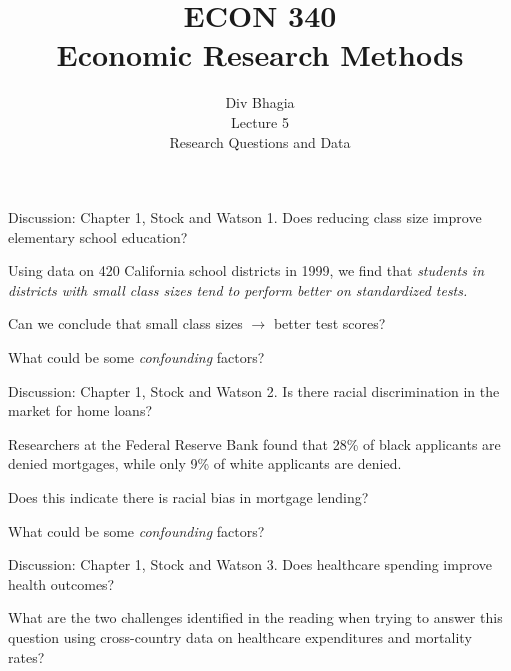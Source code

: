 \documentclass{./../div_teaching_slides}
\begin{document}
\title{ECON 340 \\ Economic Research Methods}
\author{Div Bhagia \\\vspace{1.75em}
Lecture 5 \\\vspace{0.25em} \small Research Questions and Data}
\date{}

\begin{frame}
\maketitle
\end{frame}

\begin{frame}{Discussion: Chapter 1, Stock and Watson}
1. Does reducing class size improve elementary school education? \\ \vspace{0.5em}
\begin{witemize}
  \item Using data on 420 California school districts in 1999, we find that \textit{students in districts with small class sizes tend to perform better on standardized tests.}
  \item Can we conclude that small class sizes $\rightarrow$ better test scores?
  \item What could be some \textit{confounding} factors?
\end{witemize}
\end{frame}

\begin{frame}{Discussion: Chapter 1, Stock and Watson}
2. Is there racial discrimination in the market for home loans? \\ \vspace{0.5em}
\begin{witemize}
  \item Researchers at the Federal Reserve Bank found that 28\% of black applicants are denied mortgages, while only 9\% of white applicants are denied.
  \item Does this indicate there is racial bias in mortgage lending?
  \item What could be some \textit{confounding} factors?
\end{witemize}
\end{frame}

\begin{frame}{Discussion: Chapter 1, Stock and Watson}
3. Does healthcare spending improve health outcomes? \\ \vspace{0.5em}
\begin{witemize}
  \item What are the two challenges identified in the reading when trying to answer this question using cross-country data on healthcare expenditures and mortality rates? 
\end{witemize}
\end{frame}
\end{document}
